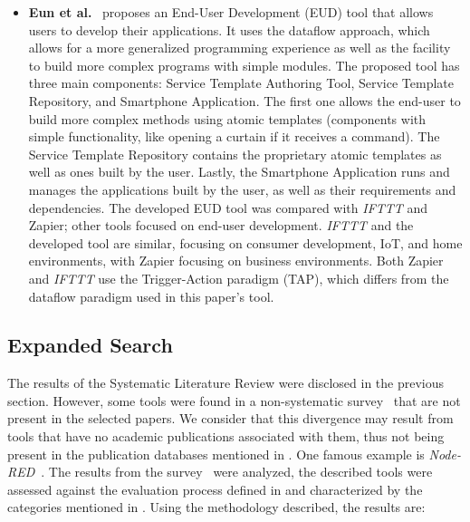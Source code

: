 \begin{itemize}
\item\textbf{Eun et al.}~\cite{eud_platform} proposes an End-User Development (EUD) tool that allows users to develop their applications. It uses the dataflow approach, which allows for a more generalized programming experience as well as the facility to build more complex programs with simple modules. The proposed tool has three main components: Service Template Authoring Tool, Service Template Repository, and Smartphone Application. The first one allows the end-user to build more complex methods using atomic templates (components with simple functionality, like opening a curtain if it receives a command). The Service Template Repository contains the proprietary atomic templates as well as ones built by the user. Lastly, the Smartphone Application runs and manages the applications built by the user, as well as their requirements and dependencies. The developed EUD tool was compared with \textit{IFTTT} and Zapier; other tools focused on end-user development. \textit{IFTTT} and the developed tool are similar, focusing on consumer development, IoT, and home environments, with Zapier focusing on business environments. Both Zapier and \textit{IFTTT} use the Trigger-Action paradigm (TAP), which differs from the dataflow paradigm used in this paper's tool.
\end{itemize}

\subsection{Expanded Search}\label{sec:slr_expanded_research}

The results of the Systematic Literature Review were disclosed in the previous section. However, some tools were found in a non-systematic survey~\cite{survey_vpl_iot} that are not present in the selected papers. We consider that this divergence may result from tools that have no academic publications associated with them, thus not being present in the publication databases mentioned in . One famous example is \textit{Node-RED}~\cite{node_red}. The results from the survey~\cite{survey_vpl_iot} were analyzed, the described tools were assessed against the evaluation process defined in  and characterized by the categories mentioned in . Using the methodology described, the results are:

